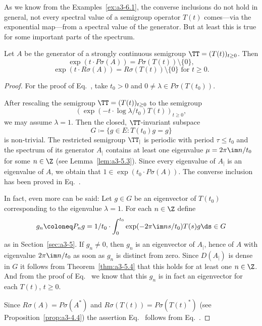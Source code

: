 As we know from the Examples~\ref{ex:a3-6.1}, the converse inclusions do not hold in general, \ie not every spectral value of a semigroup operator $T(t)$ comes---via the exponential map---from a spectral value of the generator.
But at least this is true for some important parts of the spectrum.
\begin{theorem}\label{thm:a3-6.3}%
Let $A$ be the generator of a strongly continuous semigroup $\TT = (T(t))_{t \geq 0}$.
Then
\begin{equation}\label{eq:a3-6.4}
\exp(t \cdot P\sigma(A)) = P\sigma(T(t)) \setminus \{0\} ,
\end{equation}
\begin{equation}\label{eq:a3-6.5}
\exp(t \cdot R\sigma(A)) = R\sigma(T(t)) \setminus \{0\} \text{ for } t \geq 0 .
\end{equation}
\end{theorem}
\begin{proof}
For the proof of Eq.~,  take $t_{0} > 0$ and $0 \neq \lambda \in P\sigma(T(t_{0}))$.

After rescaling the semigroup $\TT = (T(t))_{t \geq 0}$ to the semigroup
\[
(\exp(-t \cdot \log\lambda/t_{0})T(t))_{t \geq 0} ,
\]
we may assume $\lambda = 1$. 
Then the closed, $\TT$-invariant subspace
\[
G \coloneq \{g \in E \colon T(t_{0})g = g\}
\]
is non-trivial.
The restricted semigroup $\TT_{|}$ is periodic with period $\tau \leq t_{0}$ and the spectrum of its generator $A_{|}$ contains at least one eigenvalue $\mu = 2\pi\im n/t_{0}$ for some $n \in \Z$ (see Lemma~\ref{lem:a3-5.3}).
Since every eigenvalue of\/ $A_{|}$ is an eigenvalue of\/ $A$, we obtain that $1 \in \exp(t_{0} \cdot P\sigma(A))$.
The converse inclusion has been proved in Eq.~.

In fact, even more can be said: Let $g \in G$ be an eigenvector of\/ $T(t_{0})$ corresponding to the eigenvalue $\lambda = 1$.
For each $n \in \Z$ define
\[
g_{n} \coloneq P_{n}g = 1/t_{0} \cdot \int_{0}^{t_{0}} \exp(-2\pi\im ns/t_{0})T(s)g  \ds \in G
\]
as in Section~\ref{sec:a3-5}.
If\/ $g_{n} \ne 0$, then $g_{n}$ is an eigenvector of\/ $A_{|}$, hence of\/ $A$ with eigenvalue $2\pi\im n/t_{0}$ as soon as $g_{n}$ is distinct from zero.
Since $D(A_{|})$ is dense in $G$ it follows from Theorem~\ref{thm:a3-5.4} that this holds for at least one $n \in \Z$.
And from the proof of Eq.~ we know that this $g_{n}$ is in fact an eigenvector for each $T(t)$, $t \geq 0$.

Since $R\sigma(A) = P\sigma(A^{*})$ and $R\sigma(T(t)) = P\sigma(T(t)^{*})$ (see Proposition~\ref{prop:a3-4.4}) the assertion Eq.~  follows from Eq.~.
\end{proof}
